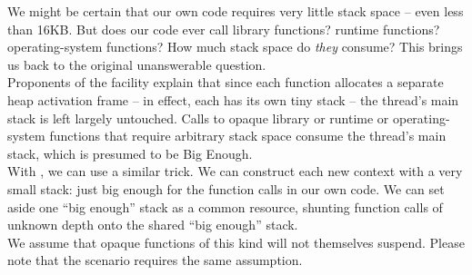 We might be certain that our own code requires very little stack space -- even
less than 16KB. But does our code ever call library functions? runtime
functions? operating-system functions? How much stack space do \emph{they}
consume? This brings us back to the original unanswerable question.\\

Proponents of the \coawait facility explain that since each \coawait function
allocates a separate heap activation frame -- in effect, each has its own tiny
stack -- the thread's main stack is left largely untouched. Calls to opaque
library or runtime or operating-system functions that require arbitrary stack
space consume the thread's main stack, which is presumed to be Big Enough.\\

With \cc, we can use a similar trick. We can construct each new context with a
very small stack: just big enough for the function calls in our own code. We
can set aside one ``big enough'' stack as a common resource, shunting function
calls of unknown depth onto the shared ``big enough'' stack.\\

We assume that opaque functions of this kind will not themselves suspend.
Please note that the \coawait scenario requires the same assumption.\\


